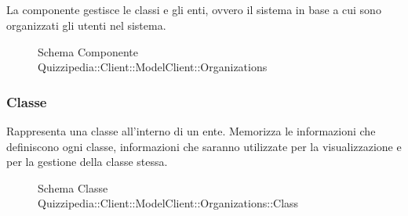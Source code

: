 \subsection{}
La componente gestisce le classi e gli enti, ovvero il sistema in base a cui sono organizzati gli utenti nel sistema.
\begin{figure}[H]
\centering
\noindent{}
\caption[Schema Componente Quizzipedia::Client::ModelClient::Organizations]{Schema Componente Quizzipedia::Client::ModelClient::Organizations}
\end{figure}
\subsubsection{Classe }
Rappresenta una classe all'interno di un ente. Memorizza le informazioni che definiscono ogni classe,
informazioni che saranno utilizzate per la visualizzazione e per la gestione della classe stessa.
\begin{figure}[H]
\centering
\noindent{}
\caption[Schema Classe Class]{Schema Classe Quizzipedia::Client::ModelClient::Organizations::Class}
\end{figure}
